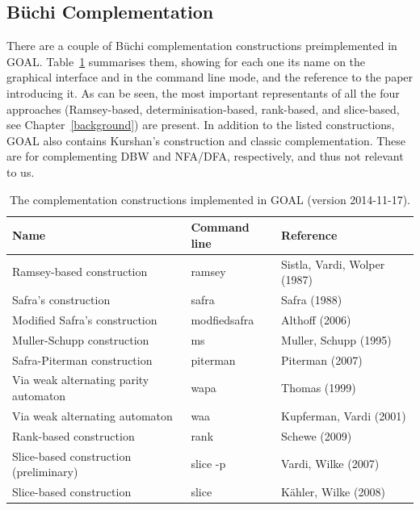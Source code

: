 \subsection{Büchi Complementation}
There are a couple of Büchi complementation constructions preimplemented in GOAL. Table~\ref{goal_constructions} summarises them, showing for each one its name on the graphical interface and in the command line mode, and the reference to the paper introducing it. As can be seen, the most important representants of all the four approaches (Ramsey-based, determinisation-based, rank-based, and slice-based, see Chapter~\ref{background}) are present. In addition to the listed constructions, GOAL also contains Kurshan's construction and classic complementation. These are for complementing DBW and NFA/DFA, respectively, and thus not relevant to us.

\begin{table}
\caption{The complementation constructions implemented in GOAL (version 2014-11-17).}
\begin{center}
\begin{tabular}{|l|l|l|}
\hline
Name & Command line & Reference \\
\hline
Ramsey-based construction & ramsey & Sistla, Vardi, Wolper (1987)~\cite{PrasadSistla1987217} \\
\hline
Safra's construction & safra & Safra (1988)~\cite{1988_safra_1} \\
\hline
Modified Safra's construction & modfiedsafra & Althoff (2006)~\cite{2006_althoff} \\
\hline
Muller-Schupp construction & ms & Muller, Schupp (1995)~\cite{Muller199569} \\
\hline
Safra-Piterman construction & piterman & Piterman (2007)~\cite{2007_piterman} \\
\hline
Via weak alternating parity automaton & wapa & Thomas (1999)~\cite{1999_thomas} \\
\hline
Via weak alternating automaton & waa & Kupferman, Vardi (2001) \cite{Kupferman:2001} \\
\hline
Rank-based construction & rank & Schewe (2009) \cite{schewe2009buchi} \\
\hline
Slice-based construction (preliminary) & slice -p & Vardi, Wilke (2007) \cite{vardi2007automata} \\
\hline
Slice-based construction & slice & Kähler, Wilke (2008) \cite{2008_kaehler} \\
\hline
\end{tabular}
\end{center}
\label{goal_constructions}
\end{table}

